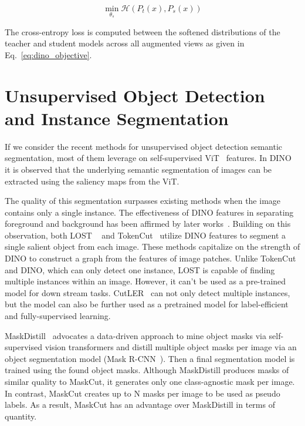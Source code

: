 \begin{equation}
	\label{eq:dino_objective}
	\min_{\theta_s} \mathcal{H}(P_t(x), P_s(x))
\end{equation}

The cross-entropy loss is computed between the softened distributions of the teacher and student models across all augmented views as given in Eq.~\ref{eq:dino_objective}.


\section{Unsupervised Object Detection and Instance Segmentation}
If we consider the recent methods for unsupervised object detection semantic segmentation, most of them leverage on self-supervised ViT~\cite{dosovitskiy2020image} features. In DINO~\cite{caron2021emerging} it is observed that the underlying semantic segmentation of images can be extracted using the saliency maps from the ViT. 

The quality of this segmentation surpasses existing methods when the image contains only a single instance. The effectiveness of DINO features in separating foreground and background has been affirmed by later works~\cite{engstler2023understanding}. Building on this observation, both LOST ~\cite{simeoni2021localizing} and TokenCut~\cite{wang2022tokencut} utilize DINO features to segment a single salient object from each image. These methods capitalize on the strength of DINO to construct a graph from the features of image patches. Unlike TokenCut and DINO, which can only detect one instance, LOST is capable of finding multiple instances within an image. However, it can't be used as a pre-trained model for down stream tasks. CutLER~\cite{wang2023cut} can not only detect multiple instances, but the model can also be further used as a pretrained model for label-efficient and fully-supervised learning.

MaskDistill~\cite{vangansbeke2022discovering} advocates a data-driven approach to mine object masks via self-supervised vision transformers and distill multiple object masks per image via an object segmentation model (Mask R-CNN~\cite{he2018maskrcnn}). Then a final segmentation model is trained using the found object masks. Although MaskDistill produces masks of similar quality to MaskCut, it generates only one class-agnostic mask per image. In contrast, MaskCut creates up to N masks per image to be used as pseudo labels. As a result, MaskCut has an advantage over MaskDistill in terms of quantity.

